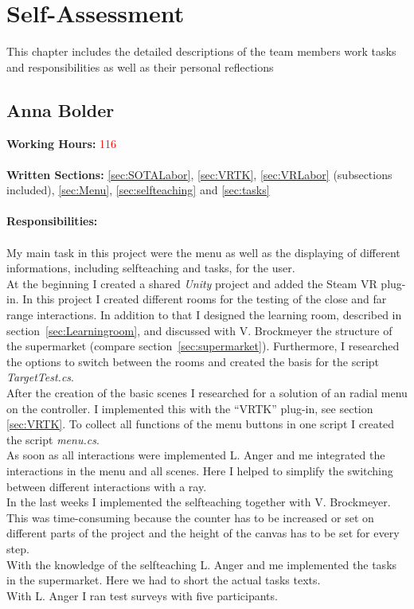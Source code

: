 \section{Self-Assessment} \label{sec:SA}

This chapter includes the detailed descriptions of the team members work tasks and responsibilities as well as their personal reflections


\subsection{Anna Bolder} \label{sec:SAAnna}

\textbf{Working Hours:} \textcolor{red}{116} \\ \\
\textbf{Written Sections:} \ref{sec:SOTALabor}, \ref{sec:VRTK},  \ref{sec:VRLabor} (subsections included), \ref{sec:Menu}, \ref{sec:selfteaching} and \ref{sec:tasks} \\ \\
\textbf{Responsibilities:}\\ \\
My main task in this project were the menu as well as the displaying of different informations, including selfteaching and tasks, for the user. \\
At the beginning I created a shared \textit{Unity} project and added the Steam VR plug-in. In this project I created different rooms for the testing of the close and far range interactions. In addition to that I designed the learning room, described in section~\ref{sec:Learningroom}, and discussed with V. Brockmeyer the structure of the supermarket (compare section~\ref{sec:supermarket}). Furthermore, I researched the options to switch between the rooms and created the basis for the script \textit{TargetTest.cs}.\\
After the creation of the basic scenes I researched for a solution of an radial menu on the controller. I implemented this with the ``VRTK'' plug-in, see section \ref{sec:VRTK}. To collect all functions of the menu buttons in one script I created the script \textit{menu.cs}.\\
As soon as all interactions were implemented L. Anger and me integrated the interactions in the menu and all scenes. Here I helped to simplify the switching between different interactions with a ray. \\
In the last weeks I implemented the selfteaching together with V. Brockmeyer. This was time-consuming because the counter has to be increased or set on different parts of the project and the height of the canvas has to be set for every step.\\
With the knowledge of the selfteaching L. Anger and me implemented the tasks in the supermarket. Here we had to short the actual tasks texts. \\
With L. Anger I ran test surveys with five participants.\\

